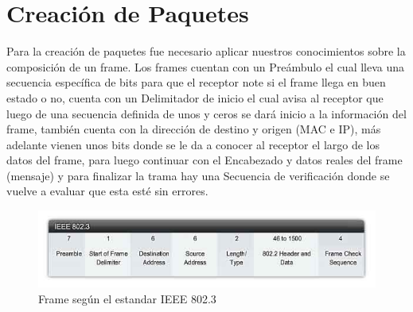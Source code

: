 \documentclass{udpreport}
\begin{document}
	\section{Creación de Paquetes}
		Para la creación de paquetes fue necesario aplicar nuestros conocimientos sobre la composición de un frame.
		Los frames cuentan con un Preámbulo el cual lleva una secuencia específica de bits para que el receptor note si el
		frame llega en buen estado o no, cuenta con un Delimitador de inicio el cual avisa al receptor que luego de una
		secuencia definida de unos y ceros se dará inicio a la información del frame, también cuenta con la dirección de
		destino y origen (MAC e IP), más adelante vienen unos bits donde se le da a conocer al receptor el largo de los datos
		del frame, para luego continuar con el Encabezado y datos reales del frame (mensaje) y para finalizar la trama hay una
		Secuencia de verificación donde se vuelve a evaluar que esta esté sin errores.\\
		\begin{figure}[H]
		    \centering
		    \includegraphics[width=\textwidth]{frame.jpg}
		    \caption{Frame según el estandar IEEE 802.3}
		\end{figure}
\end{document}

